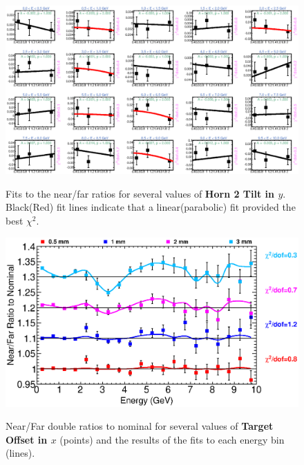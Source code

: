 {\begin{figure}[ht]
  \begin{center}
    {\includegraphics[width=5.0in]{figures/Horn2YTilt_nof_fits.eps}}
  \end{center}
\caption{ Fits to the near/far ratios for several values of {\bf Horn 2 Tilt in $y$}. Black(Red) fit lines indicate that a linear(parabolic) fit provided the best $\chi^2$. }
\end{figure}

\begin{figure}[ht]
  \begin{center}
    {\includegraphics[width=6.0in]{figures/TargetXOffset_nof_summary.eps}}
  \end{center}
\caption{ Near/Far double ratios to nominal for several values of {\bf Target Offset in $x$} (points) and the results of the fits to each energy bin (lines).}
\end{figure}

}
